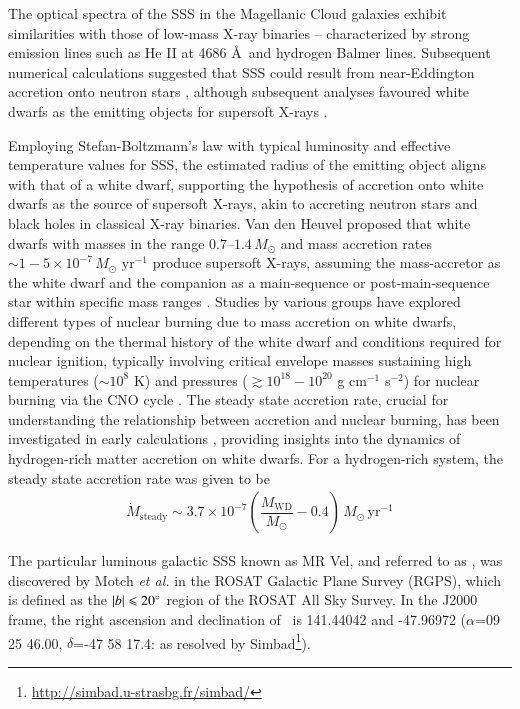     The optical spectra of the SSS in the Magellanic Cloud galaxies exhibit similarities with those of low-mass X-ray binaries -- characterized by strong emission lines such as He II at 4686 \AA\ and hydrogen Balmer lines. Subsequent numerical calculations suggested that SSS could result from near-Eddington accretion onto neutron stars \cite{kylafis93}, although subsequent analyses favoured white dwarfs as the emitting objects for supersoft X-rays \cite{vandenHeuvel92}.
    
    Employing Stefan-Boltzmann's law with typical luminosity and effective temperature values for SSS, the estimated radius of the emitting object aligns with that of a white dwarf, supporting the hypothesis of accretion onto white dwarfs as the source of supersoft X-rays, akin to accreting neutron stars and black holes in classical X-ray binaries. Van den Heuvel proposed that white dwarfs with masses in the range $0.7–1.4\,M_\odot$ and mass accretion rates $\sim 1-5\times 10^{-7}\,M_\odot\text{ yr}^{-1}$ produce supersoft X-rays, assuming the mass-accretor as the white dwarf and the companion as a main-sequence or post-main-sequence star within specific mass ranges \cite{van1992accreting}. Studies by various groups have explored different types of nuclear burning due to mass accretion on white dwarfs, depending on the thermal history of the white dwarf and conditions required for nuclear ignition, typically involving critical envelope masses %
    sustaining high temperatures ($\sim 10^8$ K) and pressures ($\gtrsim 10^{18}-10^{20}$ g cm$^{-1}$ s$^{-2}$) for nuclear burning via the CNO cycle \cite{paczynski78,prialnik78,sion79,sienkiewicz80,nomoto82,fujimoto82a,fujimoto82b,iben82,prialnik95,macdonald83}. The steady state accretion rate, crucial for understanding the relationship between accretion and nuclear burning, has been investigated in early calculations \cite{paczynski80,iben82}, providing insights into the dynamics of hydrogen-rich matter accretion on white dwarfs. For a hydrogen-rich system, the steady state accretion rate was given to be \cite{hachisu2001}
	\begin{align}
		\dot{M}_\text{steady}\sim 3.7\times 10^{-7}\left( \dfrac{M_\text{WD}}{M_\odot}-0.4 \right)\,M_\odot\,\text{yr}^{-1} \label{eqn:steady-mass-accr}
	\end{align}
	
	The particular luminous galactic SSS known as MR Vel, and referred to as \source, was discovered by Motch \textit{et al.} \cite{motch1994} in the ROSAT Galactic Plane Survey (RGPS), which  is defined as the $|b|\leqslant 20\degree$ region of the ROSAT All Sky Survey. In the J2000 frame, the right ascension and declination of \source\ is 141.44042 and -47.96972 ($\alpha$=09 25 46.00, $\delta$=-47 58 17.4: as resolved by Simbad\footnote{\url{http://simbad.u-strasbg.fr/simbad/}}).
	
